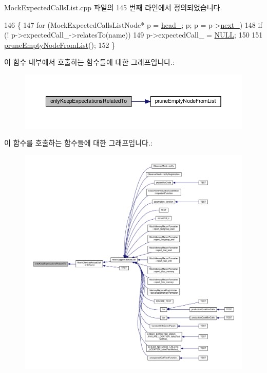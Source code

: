 Mock\+Expected\+Calls\+List.\+cpp 파일의 145 번째 라인에서 정의되었습니다.


\begin{DoxyCode}
146 \{
147     \textcolor{keywordflow}{for} (MockExpectedCallsListNode* p = \hyperlink{class_mock_expected_calls_list_a18290c3c0a206882dd8e0d9f446e2fe6}{head\_}; p; p = p->\hyperlink{class_mock_expected_calls_list_1_1_mock_expected_calls_list_node_aaae452a372ae14c06a6d5d252df73725}{next\_})
148         \textcolor{keywordflow}{if} (! p->expectedCall\_->relatesTo(name))
149             p->expectedCall\_ = \hyperlink{openavb__types__base__pub_8h_a070d2ce7b6bb7e5c05602aa8c308d0c4}{NULL};
150 
151     \hyperlink{class_mock_expected_calls_list_aeb4c1dd9901800365e942770b132c94b}{pruneEmptyNodeFromList}();
152 \}
\end{DoxyCode}


이 함수 내부에서 호출하는 함수들에 대한 그래프입니다.\+:
\nopagebreak
\begin{figure}[H]
\begin{center}
\leavevmode
\includegraphics[width=350pt]{class_mock_expected_calls_list_a108af446766baeaec398000b6a4fd418_cgraph}
\end{center}
\end{figure}




이 함수를 호출하는 함수들에 대한 그래프입니다.\+:
\nopagebreak
\begin{figure}[H]
\begin{center}
\leavevmode
\includegraphics[width=350pt]{class_mock_expected_calls_list_a108af446766baeaec398000b6a4fd418_icgraph}
\end{center}
\end{figure}



